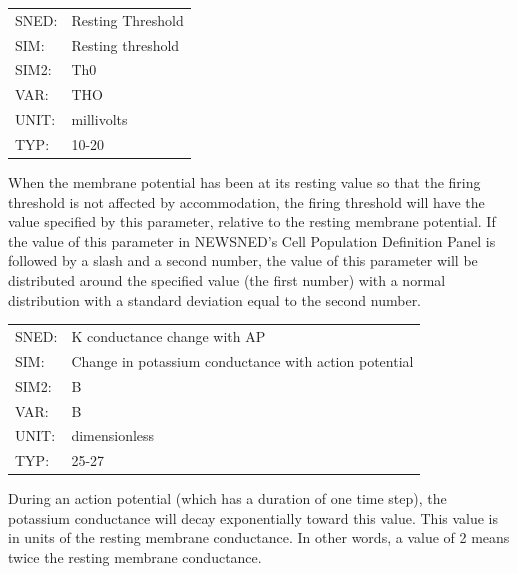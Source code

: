 \documentclass[12pt,openany,oneside]{book}
\begin{document}
\begin{flushleft}
\begin{tabular}{@{}ll@{}}
SNED: & Resting Threshold\\
SIM: & Resting threshold\\
SIM2: & Th0\\
VAR: & THO\\
UNIT: & millivolts\\
TYP: & 10-20\\
\end{tabular}
\end{flushleft}
\noindent
When the membrane potential has been at its resting value so that the
firing threshold is not affected by accommodation, the firing
threshold will have the value specified by this parameter, relative to
the resting membrane potential.  If the value of this parameter in
NEWSNED's Cell Population Definition Panel is followed by a slash and
a second number, the value of this parameter will be distributed
around the specified value (the first number) with a normal
distribution with a standard deviation equal to the second number.
\filbreak
\vspace{\baselineskip}

\label{B}
\begin{flushleft}
\begin{tabular}{@{}ll@{}}
SNED: & K conductance change with AP\\
SIM: & Change in potassium conductance with action potential\\
SIM2: & B\\
VAR: & B\\
UNIT: & dimensionless\\
TYP: & 25-27\\
\end{tabular}
\end{flushleft}
\noindent
During an action potential (which has a duration of one time step),
the potassium conductance will decay exponentially toward this value.
This value is in units of the resting membrane conductance.  In other
words, a value of 2 means twice the resting membrane conductance.
\filbreak
\vspace{\baselineskip}
\end{document}
